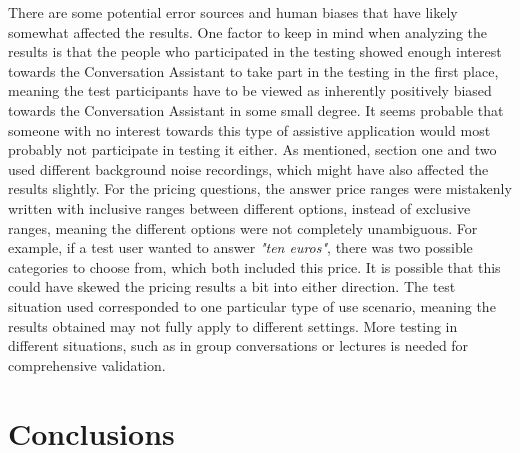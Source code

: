 \documentclass[english, 12pt, a4paper, pdftex, elec, utf8]{aaltothesis}
\begin{document}
There are some potential error sources and human biases that have likely somewhat affected the results. One factor to keep in mind when analyzing the results is that the people who participated in the testing showed enough interest towards the Conversation Assistant to take part in the testing in the first place, meaning the test participants have to be viewed as inherently positively biased towards the Conversation Assistant in some small degree. It seems probable that someone with no interest towards this type of assistive application would most probably not participate in testing it either. As mentioned, section one and two used different background noise recordings, which might have also affected the results slightly. For the pricing questions, the answer price ranges were mistakenly written with inclusive ranges between different options, instead of exclusive ranges, meaning the different options were not completely unambiguous. For example, if a test user wanted to answer \textit{"ten euros"}, there was two possible categories to choose from, which both included this price. It is possible that this could have skewed the pricing results a bit into either direction. The test situation used corresponded to one particular type of use scenario, meaning the results obtained may not fully apply to different settings. More testing in different situations, such as in group conversations or lectures  is needed for comprehensive validation. 

\section{Conclusions} \label{sec:loppu}
\end{document}
